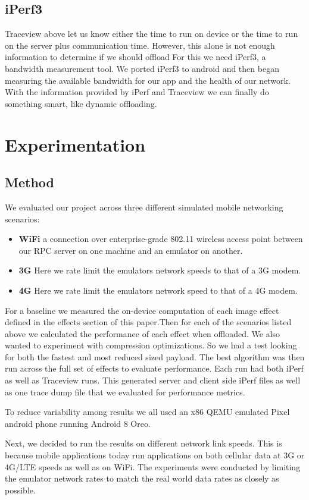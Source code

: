 \documentclass{sig-alternate}
\begin{document}
\subsection{iPerf3}
Traceview above let us know either the time to run on device or the time to run on the server plus communication time. However, this alone is not enough information to determine if we should offload For this we need iPerf3, a bandwidth measurement tool. We ported iPerf3 to android and then began measuring the available bandwidth for our app and the health of our network. With the information provided by iPerf and Traceview we can finally do something smart, like dynamic offloading.

\section{Experimentation}
\subsection{Method}
We evaluated our project across three different simulated mobile networking scenarios:
\begin{itemize}
\item \textbf{WiFi} a connection over enterprise-grade 802.11 wireless access point between our RPC server on one machine and an emulator on another. 
\item \textbf{3G} Here we rate limit the emulators network speeds to that of a 3G modem.
\item \textbf{4G} Here we rate limit the emulators network speed to that of a 4G modem.
\end{itemize}
For a baseline we measured the on-device computation of each image effect defined in the effects section of this paper.Then for each of the scenarios listed above we calculated the performance of each effect when offloaded. We also wanted to experiment with compression optimizations. So we had a test looking for both the fastest and most reduced sized payload. The best algorithm was then run across the full set of effects to evaluate performance.   
Each run had both iPerf as well as Traceview runs. This generated server and client side iPerf files as well as one trace dump file that we evaluated for performance metrics.

To reduce variability among results we all used an x86 QEMU emulated Pixel android phone running Android 8 Oreo.

Next, we decided to run the results on different network link speeds. This is because mobile applications today run applications on both cellular data at 3G or 4G/LTE speeds as well as on WiFi. The experiments were conducted by limiting the emulator network rates to match the real world data rates as closely as possible.
\end{document}
